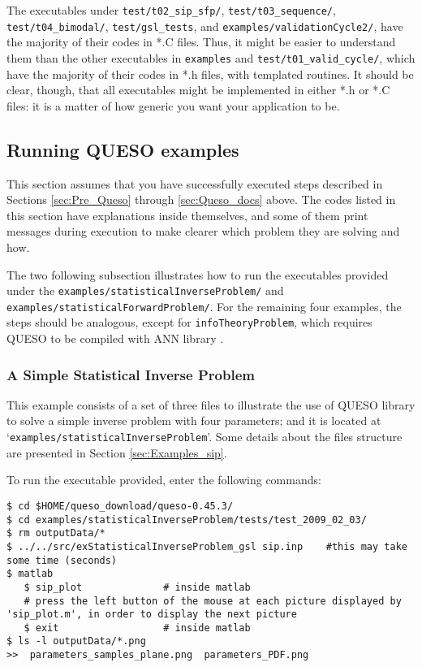 The executables under \texttt{test/t02\_sip\_sfp/},  \texttt{test/t03\_sequence/}, \texttt{test/t04\_bimodal/},   \texttt{test/gsl\_tests}, and \texttt{examples/validationCycle2/}, have the majority of their codes in *.C files.
Thus, it might be easier to understand them than the other executables in  \texttt{examples} and \texttt{test/t01\_valid\_cycle/}, which
have the majority of their codes in *.h files, with templated routines.
It should be clear, though, that all executables might be implemented in either *.h or *.C files: it is a matter of how generic you want your application to be.


\subsection{Running QUESO examples} \label{sc-running-execs}

This section assumes that you have successfully executed steps described in Sections \ref{sec:Pre_Queso} through \ref{sec:Queso_docs} above.
The codes listed in this section have explanations inside themselves, and some of them
print messages during execution to make clearer which problem they are solving and how. 


The two following subsection illustrates how to run the executables provided under the \verb+examples/statisticalInverseProblem/+ and \verb+examples/statisticalForwardProblem/+. For the remaining four examples, the steps should be analogous, except for \verb+infoTheoryProblem+, which requires QUESO to be compiled with ANN library \cite{ANN}.

\subsubsection{A Simple Statistical Inverse Problem}\label{sec:executable_sip}

This example consists of a set  of three files to illustrate the use of QUESO library to solve a simple inverse problem with four parameters; and it is located at `\verb+examples/statisticalInverseProblem+'. Some details about the files structure are presented in Section \ref{sec:Examples_sip}.

To run the executable provided, enter the following commands:
\begin{lstlisting}[label={},caption={}]
$ cd $HOME/queso_download/queso-0.45.3/
$ cd examples/statisticalInverseProblem/tests/test_2009_02_03/
$ rm outputData/*
$ ../../src/exStatisticalInverseProblem_gsl sip.inp    #this may take some time (seconds)
$ matlab
   $ sip_plot	           # inside matlab
   # press the left button of the mouse at each picture displayed by 'sip_plot.m', in order to display the next picture
   $ exit	               # inside matlab
$ ls -l outputData/*.png
>>  parameters_samples_plane.png  parameters_PDF.png
\end{lstlisting}

